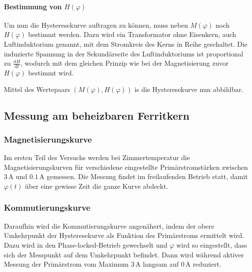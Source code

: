 \documentclass[12pt,a4paper]{scrartcl}
\numberwithin{equation}{section} %
\renewcommand{\[}{} %
\renewcommand{\]}{\noindent} %
\begin{document}
\hypertarget{bestimmung-von-hvarphi}{%
\paragraph{\texorpdfstring{Bestimmung von
\(H(\varphi)\)}{Bestimmung von H(\textbackslash varphi)}}\label{bestimmung-von-hvarphi}}

Um nun die Hysteresekurve auftragen zu können, muss neben \(M(\varphi)\)
noch \(H(\varphi)\) bestimmt werden. Dazu wird ein Transformator ohne
Eisenkern, auch Luftinduktorium genannt, mit dem Stromkreis des Kerns in
Reihe geschaltet. Die induzierte Spannung in der Sekundärseite des
Luftinduktoriums ist proportional zu \(\frac{\mathrm dH}{\mathrm dt}\),
wodurch mit dem gleichen Prinzip wie bei der Magnetisierung zuvor
\(H(\varphi)\) bestimmt wird.

Mittel des Wertepaars \((M(\varphi), H(\varphi))\) is die Hysteresekurve
nun abbildbar.

\hypertarget{messung-am-beheizbaren-ferritkern}{%
\subsection{Messung am beheizbaren
Ferritkern}\label{messung-am-beheizbaren-ferritkern}}

\hypertarget{magnetisierungskurve}{%
\subsubsection{Magnetisierungskurve}\label{magnetisierungskurve}}

Im ersten Teil des Versuchs werden bei Zimmertemperatur die
Magnetisierungskurven für verschiedene eingestellte Primärstromstärken
zwischen \(3\,\mathrm A\) und \(0.1\,\mathrm A\) gemessen. Die Messung
findet im freilaufenden Betrieb statt, damit \(\varphi(t)\) über eine
gewisse Zeit die ganze Kurve abdeckt.

\hypertarget{kommutierungskurve}{%
\subsubsection{Kommutierungskurve}\label{kommutierungskurve}}

Daraufhin wird die Kommutierungskurve angenähert, indem der obere
Umkehrpunkt der Hysteresekurve als Funktion des Primärstroms ermittelt
wird. Dazu wird in den Phase-locked-Betrieb gewechselt und \(\varphi\)
wird so eingestellt, dass sich der Messpunkt auf dem Umkehrpunkt
befindet. Dann wird während aktiver Messung der Primärstrom vom Maximum
\(3\,\mathrm A\) langsam auf \(0\,\mathrm A\) reduziert.
\end{document}

